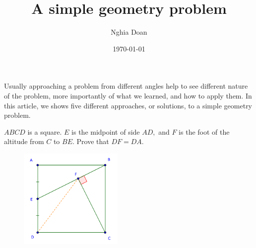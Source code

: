 \documentclass{article}
\title{A simple geometry problem}
\author{Nghia Doan}
\date{\today}
\begin{document}
\maketitle

Usually approaching a problem from different angles help to see different nature of the problem,
more importantly of what we learned, and how to apply them.
In this article, we shows five different approaches, or solutions, to a simple geometry problem.

\begin{example*}
    
    $ABCD$ is a square. $E$ is the midpoint of side $AD,$
    and $F$ is the foot of the altitude from $C$ to $BE.$
    Prove that $DF = DA.$
\end{example*}

\begin{figure}[h]
    \centering
    \includegraphics[width=5cm]{./svg/pdf/2022-2-ms-1-1.pdf}
\end{figure}
\end{document}
